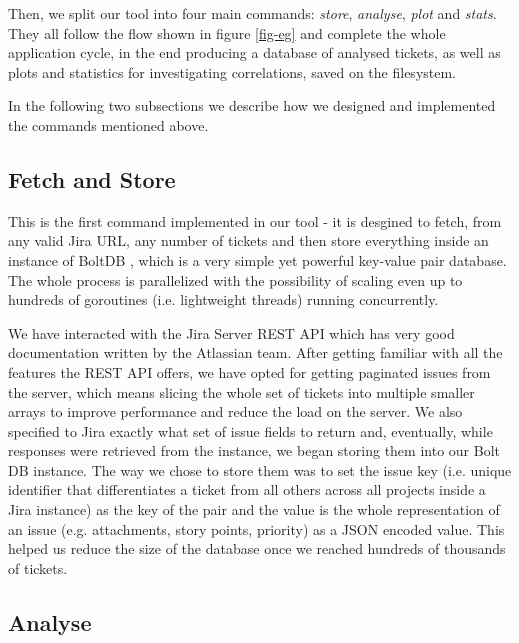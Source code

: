 \documentclass{mpaper}
\begin{document}
Then, we split our tool into four main commands: \emph{store}, \emph{analyse}, \emph{plot} and \emph{stats}. They all 
follow the flow shown in figure \ref{fig-eg} and complete the whole application cycle, in the end producing a database 
of analysed tickets, as well as plots and statistics for investigating correlations, saved on the filesystem.

In the following two subsections we describe how we designed and implemented the commands mentioned above.

\subsection{Fetch and Store}

This is the first command implemented in our tool - it is desgined to fetch, from any valid Jira URL, any number of tickets 
and then store everything inside an instance of BoltDB \cite{bolt}, which is a very simple yet powerful key-value pair 
database. The whole process is parallelized with the possibility of scaling even up to hundreds of goroutines
(i.e. lightweight threads) running concurrently.

We have interacted with the Jira Server REST API which has very good documentation written by the Atlassian team. After getting
familiar with all the features the REST API offers, we have opted for getting paginated issues from the server, which means 
slicing the whole set of tickets into multiple smaller arrays to improve performance and reduce the load on the server. We also
specified to Jira exactly what set of issue fields to return and, eventually, while responses were retrieved from the instance,
we began storing them into our Bolt DB instance. The way we chose to store them was to set the issue key (i.e. unique 
identifier that differentiates a ticket from all others across all projects inside a Jira instance) as the key of the pair and
the value is the whole representation of an issue (e.g. attachments, story points, priority) as a JSON encoded value. This
helped us reduce the size of the database once we reached hundreds of thousands of tickets.

\subsection{Analyse}
\end{document}
